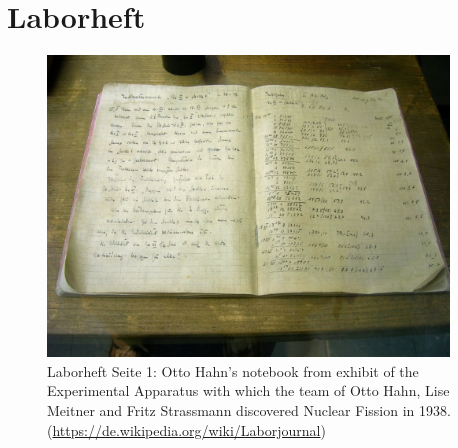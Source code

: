 \section{Laborheft}
\begin{figure}[H]
    \centering
    \includegraphics[width = 0.95\textwidth]{../labnotes/labnotes01}
    \caption{Laborheft Seite 1: Otto Hahn's notebook from exhibit of the Experimental Apparatus with which the team of Otto Hahn, Lise Meitner and Fritz Strassmann discovered Nuclear Fission in 1938.(\url{https://de.wikipedia.org/wiki/Laborjournal})}
    \label{fig:labnotes1}
\end{figure}



